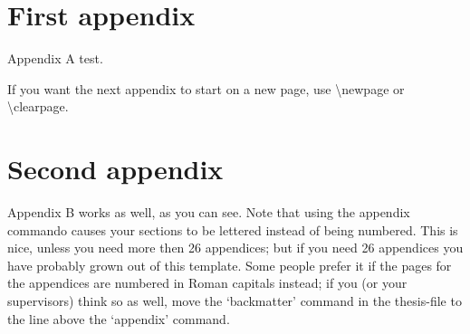 \documentclass[thesis]{subfiles}
\begin{document}
\section{First appendix} %
Appendix A test.

If you want the next appendix to start on a new page, use \textbackslash newpage or \textbackslash clearpage. %

\section{Second appendix}
Appendix B works as well, as you can see.
Note that using the appendix commando causes your sections to be lettered instead of being numbered. This is nice, unless you need more then 26 appendices; but if you need 26 appendices you have probably grown out of this template.
\bigbreak
Some people prefer it if the pages for the appendices are numbered in Roman capitals instead; if you (or your supervisors) think so as well, move the `backmatter' command in the thesis-file to the line above the `appendix' command. 
\end{document}
